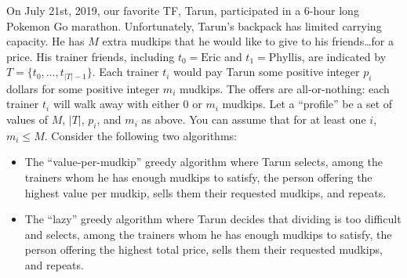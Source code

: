 \documentclass[11pt,letterpaper]{article}
\begin{document}
\pagebreak
\begin{problem}
    On July 21st, 2019, our favorite TF, Tarun, participated in a 6-hour long Pokemon Go marathon.  Unfortunately, Tarun's backpack has limited carrying capacity. He has $M$ extra mudkips that he would like to give to his friends\ldots for a price. His trainer friends, including $t_0 = \text{Eric}$ and $t_1 = \text{Phyllis}$, are indicated by $T = \{t_0, \ldots, t_{|T|-1}\}.$ Each trainer $t_i$ would pay Tarun some positive integer $p_i$ dollars for some positive integer $m_i$ mudkips. The offers are all-or-nothing: each trainer $t_i$ will walk away with either $0$ or $m_i$ mudkips. Let a ``profile'' be a set of values of $M$, $|T|$, $p_i$, and $m_i$ as above. You can assume that for at least one $i$, $m_i \le M$. Consider the following two algorithms: 

    \begin{itemize}
        \item The ``value-per-mudkip'' greedy algorithm where Tarun selects, among the trainers whom he has enough mudkips to satisfy, the person offering the highest value per mudkip, sells them their requested mudkips, and repeats.
        \item The ``lazy'' greedy algorithm where Tarun decides that dividing is too difficult and selects, among the trainers whom he has enough mudkips to satisfy, the person offering the highest total price, sells them their requested mudkips, and repeats.
    \end{itemize}

    \hr


\end{problem}
\end{document}
